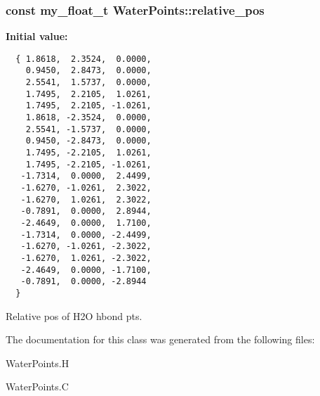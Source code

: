 \subsubsection{\setlength{\rightskip}{0pt plus 5cm}const my\_\-float\_\-t \bf{Water\-Points::relative\_\-pos}\hspace{0.3cm}{\tt  [static, private]}}\label{classASCbase_1_1WaterPoints_00f83dfce139f11e124c5258a68ffc7b}


\textbf{Initial value:}

\begin{Code}\begin{verbatim} 
  { 1.8618,  2.3524,  0.0000,
    0.9450,  2.8473,  0.0000,
    2.5541,  1.5737,  0.0000,
    1.7495,  2.2105,  1.0261,
    1.7495,  2.2105, -1.0261,
    1.8618, -2.3524,  0.0000,
    2.5541, -1.5737,  0.0000,
    0.9450, -2.8473,  0.0000,
    1.7495, -2.2105,  1.0261,
    1.7495, -2.2105, -1.0261,
   -1.7314,  0.0000,  2.4499,
   -1.6270, -1.0261,  2.3022,
   -1.6270,  1.0261,  2.3022,
   -0.7891,  0.0000,  2.8944,
   -2.4649,  0.0000,  1.7100,
   -1.7314,  0.0000, -2.4499,
   -1.6270, -1.0261, -2.3022,
   -1.6270,  1.0261, -2.3022,
   -2.4649,  0.0000, -1.7100,
   -0.7891,  0.0000, -2.8944
  }
\end{verbatim}\end{Code}
Relative pos of H2O hbond pts. 



The documentation for this class was generated from the following files:\begin{CompactItemize}
\item 
Water\-Points.H\item 
Water\-Points.C\end{CompactItemize}
